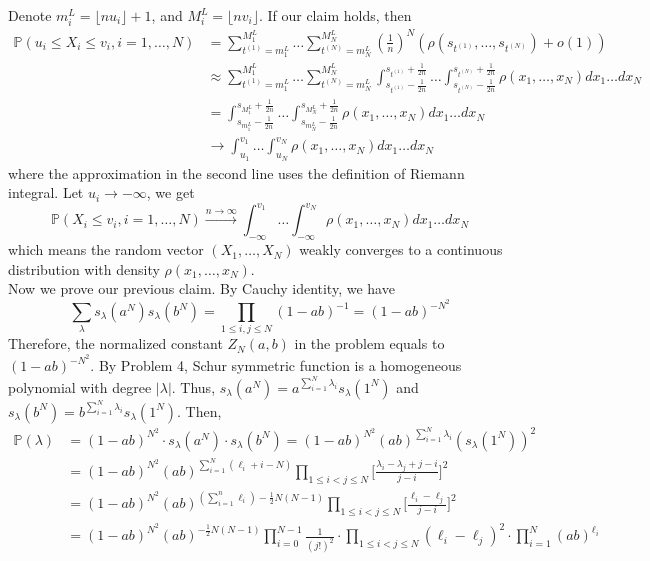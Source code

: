 \documentclass[12pt]{article}
\begin{document}
Denote $m^{L}_{i}=\lfloor nu_{i}\rfloor+1$, and $M^{L}_{i}=\lfloor nv_{i}\rfloor$. If our claim holds, then
\begin{align*}
\mathbb{P}(u_{i}\leqslant X_{i} \leqslant v_{i}, i=1, \dots, N)&=\sum_{t^{(1)}=m_{1}^{L}}^{M_{1}^{L}}\dots\sum_{t^{(N)}=m_{N}^{L}}^{M_{N}^{L}}(\frac{1}{n})^{N}(\rho(s_{t^{(1)}},\dots, s_{t^{(N)}})+o(1))\\
&\approx \sum_{t^{(1)}=m_{1}^{L}}^{M_{1}^{L}}\dots\sum_{t^{(N)}=m_{N}^{L}}^{M_{N}^{L}}\int_{s_{t^{(1)}}-\frac{1}{2n}}^{s_{t^{(1)}}+\frac{1}{2n}}\dots\int_{s_{t^{(N)}}-\frac{1}{2n}}^{s_{t^{(N)}}+\frac{1}{2n}}\rho(x_1,\dots, x_{N})dx_{1}\dots dx_{N}\\
& = \int_{s_{m^{L}_{1}}-\frac{1}{2n}}^{s_{M^{L}_{1}}+\frac{1}{2n}}\dots\int_{s_{m^{L}_{N}}-\frac{1}{2n}}^{s_{M^{L}_{N}}+\frac{1}{2n}}\rho(x_1,\dots, x_{N})dx_{1}\dots dx_{N}\\
& \rightarrow \int_{u_{1}}^{v_{1}}\dots\int_{u_{N}}^{v_{N}}\rho(x_1,\dots, x_{N})dx_{1}\dots dx_{N}
\end{align*}
where the approximation in the second line uses the definition of Riemann integral.
Let $u_{i}\rightarrow -\infty$, we get $$\mathbb{P}(X_{i} \leqslant v_{i}, i=1, \dots, N)\xrightarrow{n\rightarrow\infty} \int_{-\infty}^{v_{1}}\dots\int_{-\infty}^{v_{N}}\rho(x_1,\dots, x_{N})dx_{1}\dots dx_{N}$$ which means the random vector $(X_{1},\dots,X_{N})$ weakly converges to a continuous distribution with density $\rho(x_{1},\dots,x_{N})$.\\
Now we prove our previous claim. By Cauchy identity, we have $$\sum_{\lambda}s_{\lambda}(a^{N})s_{\lambda}(b^{N})=\prod_{1\leqslant i,j\leqslant N}(1-ab)^{-1}=(1-ab)^{-N^2}$$ Therefore, the normalized constant $Z_{N}(a,b)$ in the problem equals to $(1-ab)^{-N^2}$. By Problem 4, Schur symmetric function is a homogeneous polynomial with degree $|\lambda|$. Thus, $s_{\lambda}(a^{N})=a^{\sum_{i=1}^{N}\lambda_{i}}s_{\lambda}(1^{N})$ and $s_{\lambda}(b^{N})=b^{\sum_{i=1}^{N}\lambda_{i}}s_{\lambda}(1^{N})$. Then,
\begin{align*}
\mathbb{P}(\lambda)&= (1-ab)^{N^2}\cdot s_{\lambda}(a^{N})\cdot s_{\lambda}(b^{N})=(1-ab)^{N^2}(ab)^{\sum_{i=1}^{N}\lambda_{i}}(s_{\lambda}(1^{N}))^{2}\\
&=(1-ab)^{N^2}(ab)^{\sum_{i=1}^{N}(\ell_{i}+i-N)}\prod_{1\leqslant i<j\leqslant N}\Big[\frac{\lambda_{i}-\lambda_{j}+j-i}{j-i}\Big]^{2}\\
&=(1-ab)^{N^2}(ab)^{(\sum_{i=1}^{n}\ell_{i})-\frac{1}{2}N(N-1)}\prod_{1\leqslant i<j\leqslant N}\Big[\frac{\ell_{i}-\ell_{j}}{j-i}\Big]^{2}\\
&=(1-ab)^{N^2}(ab)^{-\frac{1}{2}N(N-1)}\prod_{i=0}^{N-1} \frac{1}{(j!)^{2}}\cdot \prod_{1\leqslant i<j\leqslant N}(\ell_{i}-\ell_{j})^{2}\cdot\prod_{i=1}^{N}(ab)^{\ell_{i}}
\end{align*}
\end{document}
